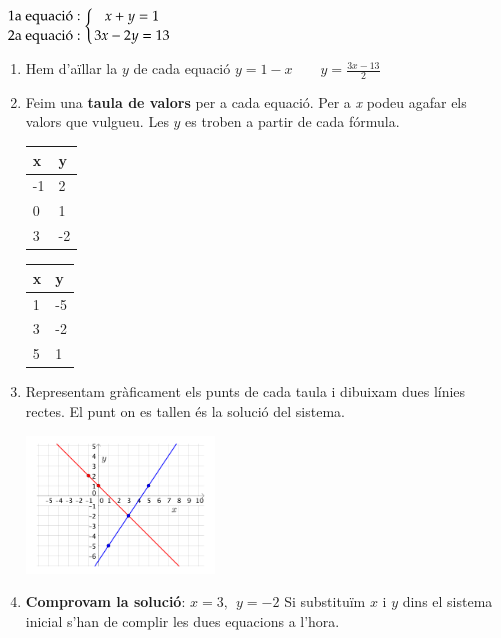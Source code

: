\begin{theorybox}
	\begin{minipage}{0.4\textwidth}
		\centering
\end{minipage}
	 \begin{minipage}{0.6\textwidth}
	 	\centering
	 	$\genfrac{}{}{0pt}{0}{\text{  1a  equaci\'o}:}{\text{  2a  equaci\'o}:} \left\{\genfrac{}{}{0pt}{0}{x+y=1}{3x-2y=13}\right.$
	 	
	 \end{minipage}
	
	\begin{enumerate}
		\item  Hem d'a\"illar la $y$ de cada equaci\'o  
				$    y=1-x  \quad\quad	y=\frac{3x-13}{2}  $
				
		\item 	 Feim una \textbf{taula de valors} per a cada equaci\'o. Per a \textit{x} podeu agafar els valors que vulgueu. Les $y$ es troben a partir de cada f\'ormula.
				\begin{center}
			\begin{tabular}{p{1.201cm}|p{1.201cm}}
			  x & y \\ \hline
			  -1 & 2 \\
			0 & 1 \\
			3 &	-2 \\  
			\end{tabular}
		\quad\quad\quad\quad
		\begin{tabular}{p{1.201cm}|p{1.201cm}}
		x & y \\ \hline
		1 & -5 \\
		3 & -2 \\
		5 &	1 \\  
	\end{tabular}
		\end{center}
		
		\item  Representam gràficament els punts de cada taula i dibuixam dues línies rectes. El punt on es tallen és la solució del sistema.
	\begin{center}
	  \includegraphics[width=5cm]{img-06/sistemagrafic}
	\end{center}
	 
	 
	\item	\textbf{ Comprovam la soluci\'o}: $\boxed{x=3,\ \ y=-2}$  Si substitu\"im $x$ i $y$ dins el sistema inicial s'han de complir les dues equacions a l'hora.
		
	\end{enumerate}	
	
\end{theorybox}

